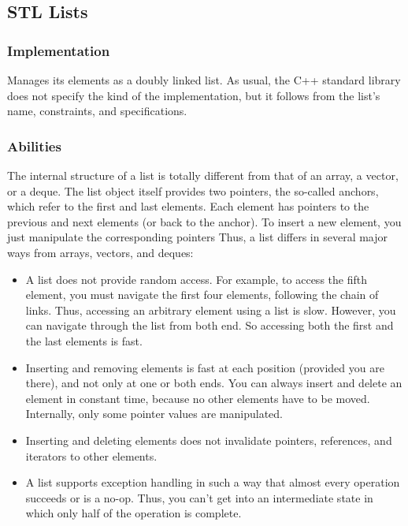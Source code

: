 \documentclass{report}
\begin{document}
   \pagebreak 
   \subsection{STL Lists}
   \bigbreak \noindent 
   \subsubsection{Implementation}
   \bigbreak \noindent 
   Manages its elements as a doubly linked list. As usual, the C++ standard library does not specify the kind of the implementation, but it follows from the list’s name, constraints, and specifications.
   \bigbreak \noindent 
   \subsubsection{Abilities}
   \bigbreak \noindent 
   The internal structure of a list is totally different from that of an array, a vector, or a deque. The list
object itself provides two pointers, the so-called anchors, which refer to the first and last elements.
Each element has pointers to the previous and next elements (or back to the anchor). To insert a new
element, you just manipulate the corresponding pointers
\bigbreak \noindent 
Thus, a list differs in several major ways from arrays, vectors, and deques:
\begin{itemize}
    \item A list does not provide random access. For example, to access the fifth element, you must navigate the first four elements, following the chain of links. Thus, accessing an arbitrary element using a list is slow. However, you can navigate through the list from both end. So accessing both the first and the last elements is fast.
    \item Inserting and removing elements is fast at each position (provided you are there), and not only at one or both ends. You can always insert and delete an element in constant time, because no other elements have to be moved. Internally, only some pointer values are manipulated.
    \item Inserting and deleting elements does not invalidate pointers, references, and iterators to other elements.
    \item A list supports exception handling in such a way that almost every operation succeeds or is a no-op. Thus, you can’t get into an intermediate state in which only half of the operation is complete.
\end{itemize}
\end{document}
